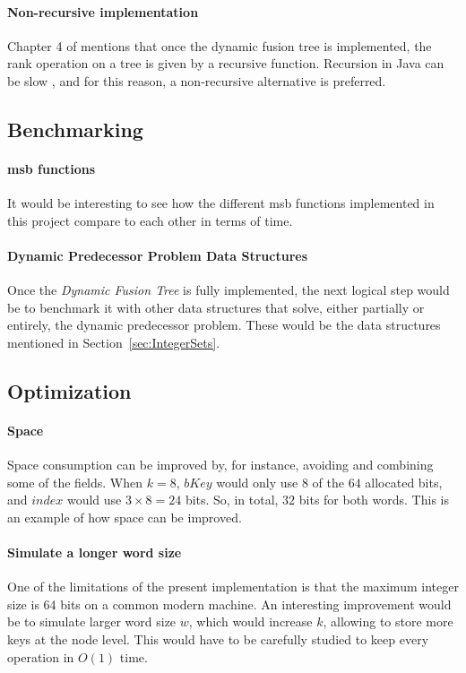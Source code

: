 \paragraph*{Non-recursive implementation}
Chapter 4 of \cite{patrascu2014dynamic} mentions that once the dynamic fusion tree is implemented, the rank operation on a tree is given by a recursive function. Recursion in Java can be slow \cite{shirazi2003java}, and for this reason, a non-recursive alternative is preferred.

\subsection{Benchmarking}

\paragraph*{msb functions}
It would be interesting to see how the different msb functions implemented in this project compare to each other in terms of time.

\paragraph*{Dynamic Predecessor Problem Data Structures}
Once the \textit{Dynamic Fusion Tree} is fully implemented, the next logical step would be to benchmark it with other data structures that solve, either partially or entirely, the dynamic predecessor problem. These would be the data structures mentioned in Section~\ref{sec:IntegerSets}.

\subsection{Optimization}

\paragraph*{Space}
Space consumption can be improved by, for instance, avoiding and combining some of the fields. When $k = 8$, $bKey$ would only use $8$ of the $64$ allocated bits, and $index$ would use $3 \times 8 = 24$ bits. So, in total, $32$ bits for both words. This is an example of how space can be improved.

\paragraph*{Simulate a longer word size}
One of the limitations of the present implementation is that the maximum integer size is 64 bits on a common modern machine. An interesting improvement would be to simulate larger word size $w$, which would increase $k$, allowing to store more keys at the node level. This would have to be carefully studied to keep every operation in $O(1)$ time.


